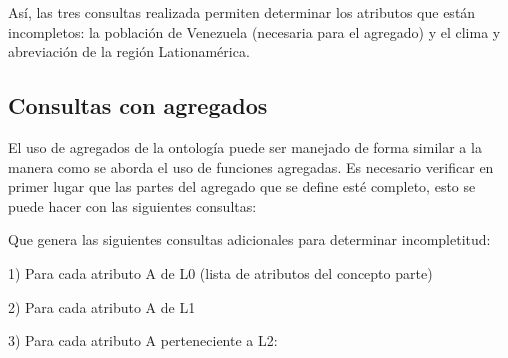 Así, las tres consultas realizada permiten determinar los atributos que están incompletos: la población de Venezuela (necesaria para el agregado) y el clima y abreviación de la región Lationamérica. \\

\subsection{Consultas con agregados}

El uso de agregados de la ontología puede ser manejado de forma similar a la manera como se aborda el uso de funciones agregadas. Es necesario verificar en primer lugar que las partes del agregado que se define esté completo, esto se puede hacer con las siguientes consultas: 


Que genera las siguientes consultas adicionales para determinar incompletitud: 

1) Para cada atributo A de L0 (lista de atributos del concepto parte) 


2) Para cada atributo A de L1 


3) Para cada atributo A perteneciente a L2: 


